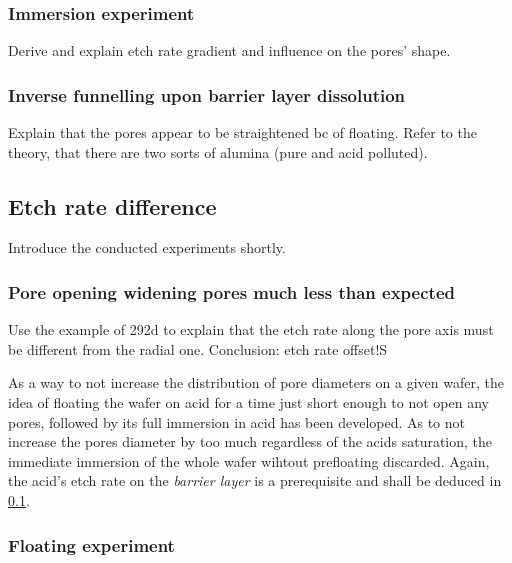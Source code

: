\documentclass[../thesis.tex]{subfiles}
\begin{document}
                \subsubsection{Immersion experiment}
                \label{subsec:immersion-experiment}

                  Derive and explain etch rate gradient and influence on the pores' shape.


                \subsubsection{Inverse funnelling upon barrier layer dissolution}
                \label{subsec:pore-opening-effect}

                  Explain that the pores appear to be straightened bc of floating. Refer to the theory, that there are two sorts of alumina (pure and acid  polluted).


        \subsection{Etch rate difference}
        \label{subsec:etch-rate-difference}

                Introduce the conducted experiments shortly.

                \subsubsection{Pore opening widening pores much less than expected}
                \label{subsec:pore-opening-pore-widening}

                  Use the example of 292d to explain that the etch rate along the pore axis must be different from the radial one. Conclusion: etch rate offset!S


                          As a way to not increase the distribution of pore diameters on a given wafer, the idea of floating the wafer on acid for a time just short enough to not open any pores, followed by its full immersion in acid has been developed. As to not increase the pores diameter by too much regardless of the acids saturation, the immediate immersion of the whole wafer wihtout prefloating discarded. Again, the acid's etch rate on the \textit{barrier layer} is a prerequisite and shall be deduced in \cref{subsec:etch-rate-difference}.


                \subsubsection{Floating experiment}
                \label{subsec:floating-experiment}
\end{document}
